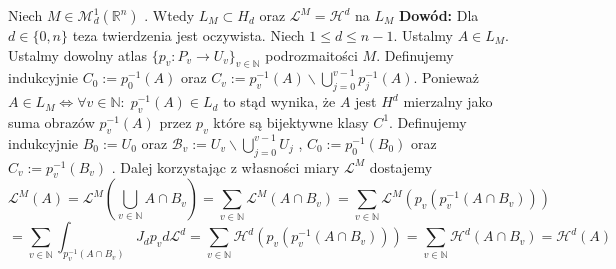 \begin{tw}
	Niech $M \in \mathcal{M}^1_d(\mathbb{R}^n)$ . Wtedy $L_M \subset H_d$ oraz $\mathcal{L}^M = \mathcal{H}^d$ na $L_M$ 
	\newline
	\textbf{Dowód:}\newline
	Dla $d \in \{0, n\}$ teza twierdzenia jest oczywista. Niech $1 \leq d \leq n -1$.
	Ustalmy $A \in L_M$. Ustalmy dowolny atlas $\{p_v: P_v \rightarrow U_v\}_{v \in \mathbb{N}}$ podrozmaitości $M$. Definujemy indukcyjnie $C_0:=p_0^{-1}(A)$ oraz $C_v := p_v^{-1}(A) \backslash \bigcup_{j=0}^{v-1} p_j^{-1}(A)$. Ponieważ $A \in L_M \Leftrightarrow \forall v \in \mathbb{N}: \; p_v^{-1}(A) \in L_d$ to stąd wynika, że $A$ jest $H^d$ mierzalny jako suma obrazów $p_v^{-1}(A)$ przez $p_v$ które są bijektywne klasy $C^1$. 
	Definujemy indukcyjnie $B_0:=U_0$ oraz $\mathcal{B}_v := U_v \backslash \bigcup_{j=0}^{v-1} U_j$ , $C_0:=p_0^{-1}(B_0)$ oraz $C_v := p_v^{-1}(B_v)$ .  Dalej korzystając z własności miary $\mathcal{L}^M$ dostajemy 
	$$
		\mathcal{L}^M(A) = \mathcal{L}^M(\bigcup_{v \in \mathbb{N}} A \cap B_v) 
		= \sum_{v \in \mathbb{N}} \mathcal{L}^M(A \cap B_v) 
		= \sum_{v \in \mathbb{N}} \mathcal{L}^M(p_v(p_v^{-1}(A \cap B_v))) 
	$$
	$$
		= \sum_{v \in \mathbb{N}} \int_{p_v^{-1}(A \cap B_v)} J_d p_v d \mathcal{L}^d
		= \sum_{v \in \mathbb{N}} \mathcal{H}^d(p_v(p_v^{-1}(A \cap B_v))) 
		= \sum_{v \in \mathbb{N}} \mathcal{H}^d(A \cap B_v) 
		= \mathcal{H}^d(A)
	$$
\end{tw}